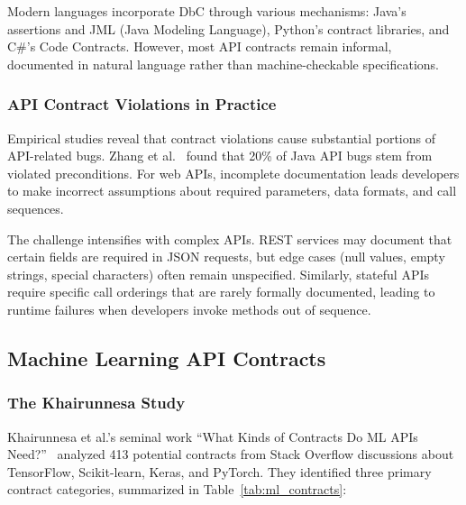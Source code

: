 \documentclass[11pt]{article}
\begin{document}
Modern languages incorporate DbC through various mechanisms: Java's assertions and JML (Java Modeling Language), Python's contract libraries, and C\#'s Code Contracts. However, most API contracts remain informal, documented in natural language rather than machine-checkable specifications.

\subsubsection{API Contract Violations in Practice}
Empirical studies reveal that contract violations cause substantial portions of API-related bugs. Zhang et al.~\cite{zhang2018empirical} found that 20\% of Java API bugs stem from violated preconditions. For web APIs, incomplete documentation leads developers to make incorrect assumptions about required parameters, data formats, and call sequences.

The challenge intensifies with complex APIs. REST services may document that certain fields are required in JSON requests, but edge cases (null values, empty strings, special characters) often remain unspecified. Similarly, stateful APIs require specific call orderings that are rarely formally documented, leading to runtime failures when developers invoke methods out of sequence.

\subsection{Machine Learning API Contracts}

\subsubsection{The Khairunnesa Study}
Khairunnesa et al.'s seminal work ``What Kinds of Contracts Do ML APIs Need?''~\cite{khairunnesa2023} analyzed 413 potential contracts from Stack Overflow discussions about TensorFlow, Scikit-learn, Keras, and PyTorch. They identified three primary contract categories, summarized in Table~\ref{tab:ml_contracts}:
\end{document}
